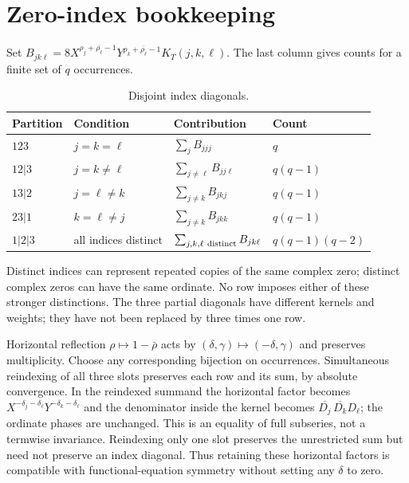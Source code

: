 \documentclass[11pt]{article}
\begin{document}
\section{Zero-index bookkeeping}

Set \(B_{jk\ell}=8X^{\rho_j+\overline{\rho_\ell}-1}
Y^{\rho_k+\overline{\rho_\ell}-1}K_T(j,k,\ell)\).
The last column gives counts for a finite set of \(q\) occurrences.
\begin{table}[ht]
\centering\small
\begin{tabular}{llll}
\toprule
Partition & Condition & Contribution & Count\\
\midrule
\(123\) & \(j=k=\ell\) & \(\sum_j B_{jjj}\) & \(q\)\\
\(12|3\) & \(j=k\ne\ell\) & \(\sum_{j\ne\ell}B_{jj\ell}\) & \(q(q-1)\)\\
\(13|2\) & \(j=\ell\ne k\) & \(\sum_{j\ne k}B_{jkj}\) & \(q(q-1)\)\\
\(23|1\) & \(k=\ell\ne j\) & \(\sum_{j\ne k}B_{jkk}\) & \(q(q-1)\)\\
\(1|2|3\) & all indices distinct & \(\sum_{j,k,\ell\ {\rm distinct}}B_{jk\ell}\)
 & \(q(q-1)(q-2)\)\\
\bottomrule
\end{tabular}
\caption{Disjoint index diagonals.}\label{tab:diagonals}
\end{table}

Distinct indices can represent repeated copies of the same complex zero;
distinct complex zeros can have the same ordinate. No row imposes either
of these stronger distinctions. The three partial diagonals have different
kernels and weights; they have not been replaced by three times one row.

Horizontal reflection \(\rho\mapsto1-\bar\rho\) acts by
\((\delta,\gamma)\mapsto(-\delta,\gamma)\) and preserves multiplicity.
Choose any corresponding bijection on occurrences. Simultaneous reindexing
of all three slots preserves each row and its sum, by absolute convergence.
In the reindexed summand the horizontal factor becomes
\(X^{-\delta_j-\delta_\ell}Y^{-\delta_k-\delta_\ell}\) and the denominator
inside the kernel becomes \(\overline{D_j}\,\overline{D_k}D_\ell\);
the ordinate phases are unchanged. This is an equality of full subseries,
not a termwise invariance. Reindexing only one slot preserves the unrestricted
sum but need not preserve an index diagonal. Thus retaining these horizontal
factors is compatible with functional-equation symmetry without setting
any \(\delta\) to zero.
\end{document}
